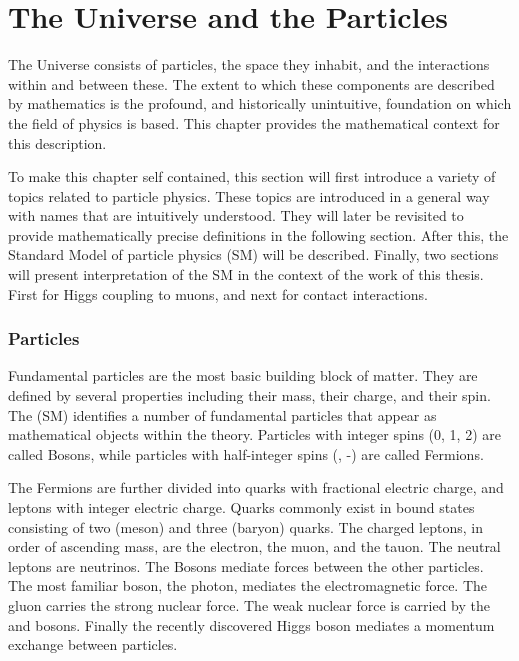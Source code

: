 \section{The Universe and the Particles}

The Universe consists of particles, the space they inhabit, and the interactions within and between these.
The extent to which these components are described by mathematics is the profound, and historically unintuitive, foundation on which the field of physics is based.
This chapter provides the mathematical context for this description.

To make this chapter self contained, this section will first introduce a variety of topics related to particle physics.
These topics are introduced in a general way with names that are intuitively understood.
They will later be revisited to provide mathematically precise definitions in the following section.
After this, the Standard Model of particle physics (SM) will be described.
Finally, two sections will present interpretation of the SM in the context of the work of this thesis. First for Higgs coupling to muons, and next for contact interactions.

\subsubsection{Particles}
Fundamental particles are the most basic building block of matter.
They are defined by several properties including their mass, their charge, and their spin.
The (SM) identifies a number of fundamental particles that appear as mathematical objects within the theory.
Particles with integer spins (0, 1, 2) are called Bosons, while particles with half-integer spins (\half, -\half) are called Fermions.

The Fermions are further divided into quarks with fractional electric charge, and leptons with integer electric charge.
Quarks commonly exist in bound states consisting of two (meson) and three (baryon) quarks.
The charged leptons, in order of ascending mass, are the electron, the muon, and the tauon.
The neutral leptons are neutrinos.
The Bosons mediate forces between the other particles.
The most familiar boson, the photon, mediates the electromagnetic force.
The gluon carries the strong nuclear force.
The weak nuclear force is carried by the \W and \Z bosons.
Finally the recently discovered Higgs boson mediates a momentum exchange between particles.

